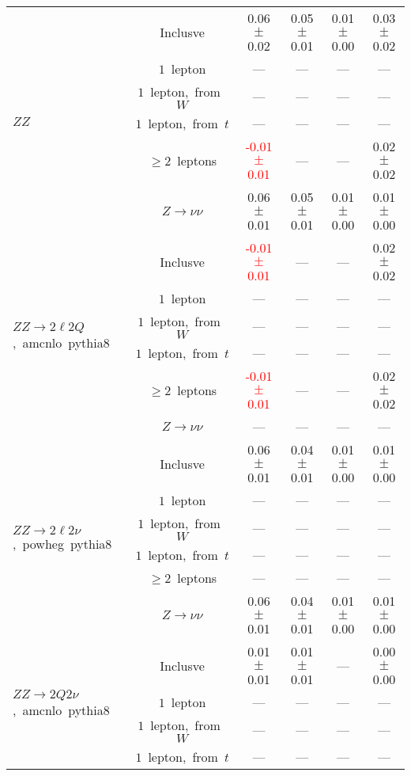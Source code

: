 \documentclass{article}
\begin{document}
\begin{longtable}{|l|c|c|c|c|c|}
\hline 
\multirow{6}{*}{$ZZ$} & Inclusve  & 0.06 $\pm$ 0.02  & 0.05 $\pm$ 0.01  & 0.01 $\pm$ 0.00  & 0.03 $\pm$ 0.02 \\* 
 & $1$~lepton  & ---  & ---  & ---  & --- \\* 
 & $1$~lepton,~from~$W$  & ---  & ---  & ---  & --- \\* 
 & $1$~lepton,~from~$t$  & ---  & ---  & ---  & --- \\* 
 & $\ge2$~leptons  & \textcolor{red}{ -0.01 $\pm$ 0.01 }  & ---  & ---  & 0.02 $\pm$ 0.02 \\* 
 & $Z\rightarrow\nu\nu$  & 0.06 $\pm$ 0.01  & 0.05 $\pm$ 0.01  & 0.01 $\pm$ 0.00  & 0.01 $\pm$ 0.00 \\* 
\hline 
\multirow{6}{*}{$ZZ{\rightarrow}2{\ell}2Q$,~amcnlo~pythia8} & Inclusve  & \textcolor{red}{ -0.01 $\pm$ 0.01 }  & ---  & ---  & 0.02 $\pm$ 0.02 \\* 
 & $1$~lepton  & ---  & ---  & ---  & --- \\* 
 & $1$~lepton,~from~$W$  & ---  & ---  & ---  & --- \\* 
 & $1$~lepton,~from~$t$  & ---  & ---  & ---  & --- \\* 
 & $\ge2$~leptons  & \textcolor{red}{ -0.01 $\pm$ 0.01 }  & ---  & ---  & 0.02 $\pm$ 0.02 \\* 
 & $Z\rightarrow\nu\nu$  & ---  & ---  & ---  & --- \\* 
\hline 
\multirow{6}{*}{$ZZ{\rightarrow}2{\ell}2{\nu}$,~powheg~pythia8} & Inclusve  & 0.06 $\pm$ 0.01  & 0.04 $\pm$ 0.01  & 0.01 $\pm$ 0.00  & 0.01 $\pm$ 0.00 \\* 
 & $1$~lepton  & ---  & ---  & ---  & --- \\* 
 & $1$~lepton,~from~$W$  & ---  & ---  & ---  & --- \\* 
 & $1$~lepton,~from~$t$  & ---  & ---  & ---  & --- \\* 
 & $\ge2$~leptons  & ---  & ---  & ---  & --- \\* 
 & $Z\rightarrow\nu\nu$  & 0.06 $\pm$ 0.01  & 0.04 $\pm$ 0.01  & 0.01 $\pm$ 0.00  & 0.01 $\pm$ 0.00 \\* 
\hline 
\multirow{6}{*}{$ZZ{\rightarrow}2Q2{\nu}$,~amcnlo~pythia8} & Inclusve  & 0.01 $\pm$ 0.01  & 0.01 $\pm$ 0.01  & ---  & 0.00 $\pm$ 0.00 \\* 
 & $1$~lepton  & ---  & ---  & ---  & --- \\* 
 & $1$~lepton,~from~$W$  & ---  & ---  & ---  & --- \\* 
 & $1$~lepton,~from~$t$  & ---  & ---  & ---  & --- \\* 

\end{longtable}
\end{document}
